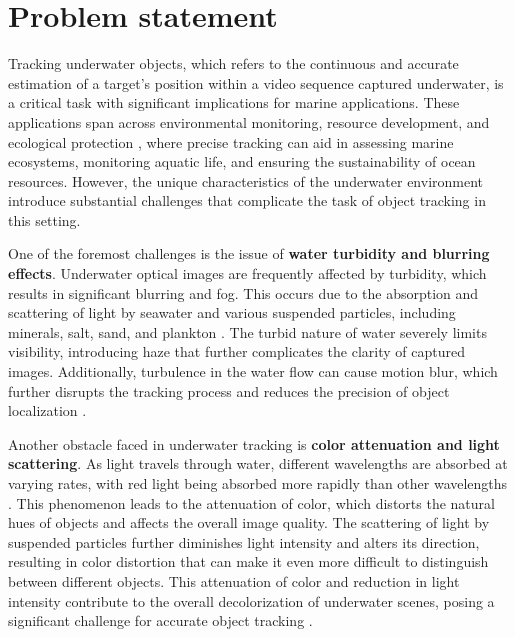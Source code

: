 \chapter{Problem statement}
\label{ch:chap1}

Tracking underwater objects, which refers to the continuous and accurate estimation of a target's position within a video sequence captured underwater, is a critical task with significant implications for marine applications. These applications span across environmental monitoring, resource development, and ecological protection \cite{qiu2024boundary}, where precise tracking can aid in assessing marine ecosystems, monitoring aquatic life, and ensuring the sustainability of ocean resources. However, the unique characteristics of the underwater environment introduce substantial challenges that complicate the task of object tracking in this setting.

One of the foremost challenges is the issue of \textbf{water turbidity and blurring effects}. Underwater optical images are frequently affected by turbidity, which results in significant blurring and fog. This occurs due to the absorption and scattering of light by seawater and various suspended particles, including minerals, salt, sand, and plankton \cite{zhou2024real}\cite{elmezain2025advancing}\cite{bhadouriaunderwater}. The turbid nature of water severely limits visibility, introducing haze that further complicates the clarity of captured images. Additionally, turbulence in the water flow can cause motion blur, which further disrupts the tracking process and reduces the precision of object localization \cite{bhadouriaunderwater}.

Another obstacle faced in underwater tracking is \textbf{color attenuation and light scattering}. As light travels through water, different wavelengths are absorbed at varying rates, with red light being absorbed more rapidly than other wavelengths \cite{elmezain2025advancing}. This phenomenon leads to the attenuation of color, which distorts the natural hues of objects and affects the overall image quality. The scattering of light by suspended particles further diminishes light intensity and alters its direction, resulting in color distortion that can make it even more difficult to distinguish between different objects. This attenuation of color and reduction in light intensity contribute to the overall decolorization of underwater scenes, posing a significant challenge for accurate object tracking \cite{elmezain2025advancing}\cite{bhadouriaunderwater}\cite{rout2019walsh}.

